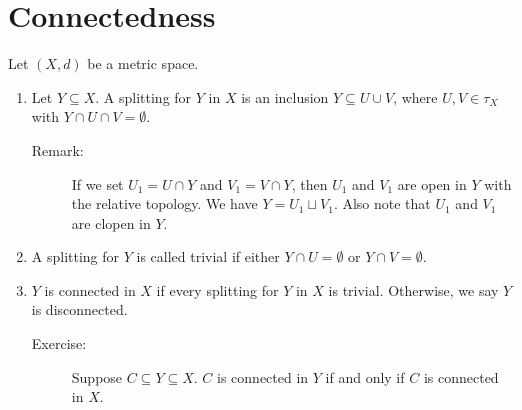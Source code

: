 \documentclass[10pt]{extarticle}
\begin{document}
  \section{Connectedness}%
  Let $(X,d)$ be a metric space. 
  \begin{enumerate}[(1)]
    \item Let $Y\subseteq X$. A splitting for $Y$ in $X$ is an inclusion $Y\subseteq U\cup V$, where $U,V\in \tau_X$ with $Y\cap U \cap V = \emptyset$.
      \begin{description}
        \item[Remark:] If we set $U_1 = U\cap Y$ and $V_1 = V\cap Y$, then $U_1$ and $V_1$ are open in $Y$ with the relative topology. We have $Y = U_1\sqcup V_1$. Also note that $U_1$ and $V_1$ are clopen in $Y$.
      \end{description}
    \item A splitting for $Y$ is called trivial if either $Y\cap U = \emptyset$ or $Y\cap V = \emptyset$.
    \item $Y$ is connected in $X$ if every splitting for $Y$ in $X$ is trivial. Otherwise, we say $Y$ is disconnected.
    \begin{description}
      \item[Exercise:] Suppose $C\subseteq Y\subseteq X$. $C$ is connected in $Y$ if and only if $C$ is connected in $X$.
    \end{description}
  \end{enumerate}
\end{document}

